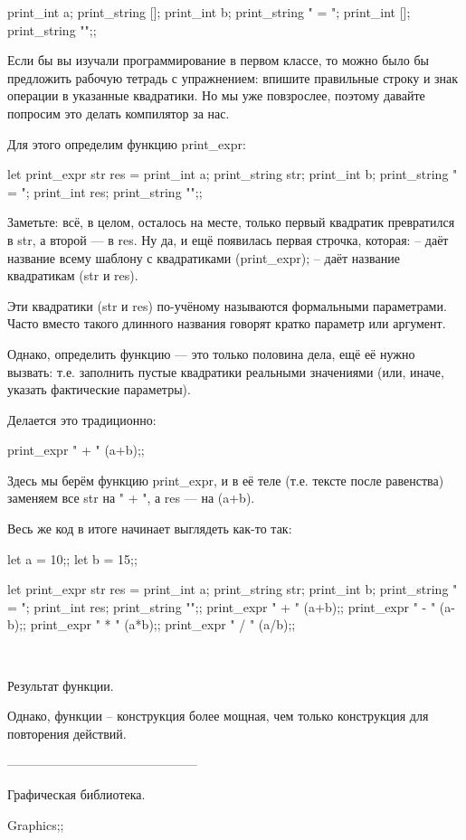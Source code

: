 print_int a; print_string []; print_int b; 
print_string " = "; print_int []; print_string "\n";;

Если бы вы изучали программирование в первом классе, то можно было бы предложить 
рабочую тетрадь с упражнением: впишите правильные строку и знак операции в указанные
квадратики. Но мы уже повзрослее, поэтому давайте попросим это делать 
компилятор за нас.

Для этого определим функцию print_expr:

let print_expr str res = 
  print_int a; print_string str; print_int b; 
  print_string " = "; print_int res; print_string "\n";;

Заметьте: всё, в целом, осталось на месте, только первый квадратик превратился в
str, а второй --- в res. Ну да, и ещё появилась первая строчка, которая:
-- даёт название всему шаблону с квадратиками (print_expr);
-- даёт название квадратикам (str и res). 

Эти квадратики (str и res) по-учёному называются формальными параметрами. Часто 
вместо такого длинного названия говорят кратко параметр или аргумент.

Однако, определить функцию --- это только половина дела, ещё её нужно вызвать:
т.е. заполнить пустые квадратики реальными значениями (или, иначе, указать
фактические параметры).

Делается это традиционно:

print_expr " + " (a+b);;

Здесь мы берём функцию print_expr, и в её теле (т.е. тексте после равенства)
заменяем все str на " + ", а res --- на (a+b).

Весь же код в итоге начинает выглядеть как-то так:

let a = 10;; let b = 15;;

let print_expr str res = 
  print_int a; print_string str; print_int b; 
  print_string " = "; print_int res; print_string "\n";;
print_expr " + " (a+b);;
print_expr " - " (a-b);;
print_expr " * " (a*b);;
print_expr " / " (a/b);;

~~~~~~~~~~~~~~~~~~~~~~~~~~~~~~~~~~~~~~~~~~~~~~~~~~~~~~~~~~~~


Результат функции.

Однако, функции -- конструкция более мощная, чем только конструкция для повторения
действий. 


---------------------------------------------

Графическая библиотека.

Graphics;;

